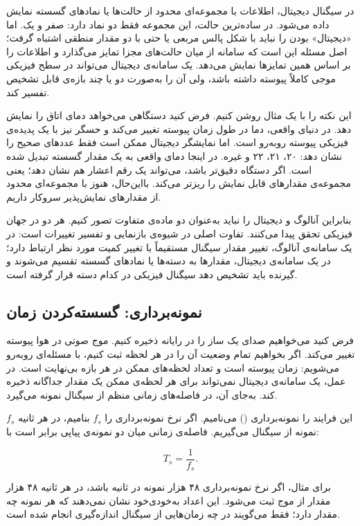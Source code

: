 در سیگنال دیجیتال، اطلاعات با مجموعه‌ای محدود از حالت‌ها یا نمادهای گسسته نمایش داده می‌شود. در ساده‌ترین حالت، این مجموعه فقط دو نماد دارد: صفر و یک. اما «دیجیتال» بودن را نباید با شکل پالس مربعی یا حتی با دو مقدار منطقی اشتباه گرفت؛ اصل مسئله این است که سامانه از میان حالت‌های مجزا تمایز می‌گذارد و اطلاعات را بر اساس همین تمایزها نمایش می‌دهد. یک سامانه‌ی دیجیتال می‌تواند در سطح فیزیکی موجی کاملاً پیوسته داشته باشد، ولی آن را به‌صورت دو یا چند بازه‌ی قابل تشخیص تفسیر کند.

این نکته را با یک مثال روشن کنیم. فرض کنید دستگاهی می‌خواهد دمای اتاق را نمایش دهد. در دنیای واقعی، دما در طول زمان پیوسته تغییر می‌کند و حسگر نیز با یک پدیده‌ی فیزیکی پیوسته روبه‌رو است. اما نمایشگر دیجیتال ممکن است فقط عددهای صحیح را نشان دهد: ۲۰، ۲۱، ۲۲ و غیره. در اینجا دمای واقعی به یک مقدار گسسته تبدیل شده است. اگر دستگاه دقیق‌تر باشد، می‌تواند یک رقم اعشار هم نشان دهد؛ یعنی مجموعه‌ی مقدارهای قابل نمایش را ریزتر می‌کند. بااین‌حال، هنوز با مجموعه‌ای محدود از مقدارهای نمایش‌پذیر سروکار داریم.

بنابراین آنالوگ و دیجیتال را نباید به‌عنوان دو ماده‌ی متفاوت تصور کنیم. هر دو در جهان فیزیکی تحقق پیدا می‌کنند. تفاوت اصلی در شیوه‌ی بازنمایی و تفسیر تغییرات است: در یک سامانه‌ی آنالوگ، تغییر مقدار سیگنال مستقیماً با تغییر کمیت مورد نظر ارتباط دارد؛ در یک سامانه‌ی دیجیتال، مقدارها به دسته‌ها یا نمادهای گسسته تقسیم می‌شوند و گیرنده باید تشخیص دهد سیگنال فیزیکی در کدام دسته قرار گرفته است.

\subsection{نمونه‌برداری: گسسته‌کردن زمان}
\label{sub:sampling-time}

فرض کنید می‌خواهیم صدای یک ساز را در رایانه ذخیره کنیم. موج صوتی در هوا پیوسته تغییر می‌کند. اگر بخواهیم تمام وضعیت آن را در هر لحظه ثبت کنیم، با مسئله‌ای روبه‌رو می‌شویم: زمان پیوسته است و تعداد لحظه‌های ممکن در هر بازه بی‌نهایت است. در عمل، یک سامانه‌ی دیجیتال نمی‌تواند برای هر لحظه‌ی ممکن یک مقدار جداگانه ذخیره کند. به‌جای آن، در فاصله‌های زمانی منظم از سیگنال نمونه می‌گیرد.

این فرایند را نمونه‌برداری () می‌نامیم. اگر نرخ نمونه‌برداری را \(f_s\) بنامیم، در هر ثانیه \(f_s\) نمونه از سیگنال می‌گیریم. فاصله‌ی زمانی میان دو نمونه‌ی پیاپی برابر است با:

\[
T_s=\frac{1}{f_s}.
\]

برای مثال، اگر نرخ نمونه‌برداری ۴۸ هزار نمونه در ثانیه باشد، در هر ثانیه ۴۸ هزار مقدار از موج ثبت می‌شود. این اعداد به‌خودی‌خود نشان نمی‌دهند که هر نمونه چه مقدار دارد؛ فقط می‌گویند در چه زمان‌هایی از سیگنال اندازه‌گیری انجام شده است.

